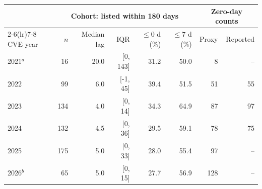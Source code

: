 \begin{tabular}{lrrrrrrr}
\toprule
 & \multicolumn{5}{c}{Cohort: listed within 180 days} & \multicolumn{2}{c}{Zero-day counts} \\
\cmidrule(lr){2-6}\cmidrule(lr){7-8}
CVE year & $n$ & Median lag & IQR & $\le 0$ d (\%) & $\le 7$ d (\%) & Proxy & Reported \\
\midrule
2021$^a$ & 16 & 20.0 & [0, 143] & 31.2 & 50.0 & 8 & -- \\
2022 & 99 & 6.0 & [-1, 45] & 39.4 & 51.5 & 51 & 55 \\
2023 & 134 & 4.0 & [0, 14] & 34.3 & 64.9 & 87 & 97 \\
2024 & 132 & 4.5 & [0, 36] & 29.5 & 59.1 & 78 & 75 \\
2025 & 175 & 5.0 & [0, 33] & 28.0 & 55.4 & 97 & -- \\
2026$^b$ & 65 & 5.0 & [0, 15] & 27.7 & 56.9 & 128 & -- \\
\bottomrule
\end{tabular}